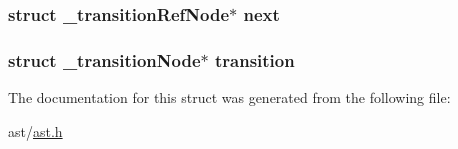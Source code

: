 \subsubsection[{\texorpdfstring{next}{next}}]{\setlength{\rightskip}{0pt plus 5cm}struct {\bf \+\_\+transition\+Ref\+Node}$\ast$ next}\hypertarget{struct__transition_ref_node_a3f0667f62208e8cfdf3d28916c738bd6}{}\label{struct__transition_ref_node_a3f0667f62208e8cfdf3d28916c738bd6}
\subsubsection[{\texorpdfstring{transition}{transition}}]{\setlength{\rightskip}{0pt plus 5cm}struct {\bf \+\_\+transition\+Node}$\ast$ transition}\hypertarget{struct__transition_ref_node_ab73ce20963a806d4098d62979f680cca}{}\label{struct__transition_ref_node_ab73ce20963a806d4098d62979f680cca}


The documentation for this struct was generated from the following file\+:\begin{DoxyCompactItemize}
\item 
ast/\hyperlink{ast_8h}{ast.\+h}\end{DoxyCompactItemize}
